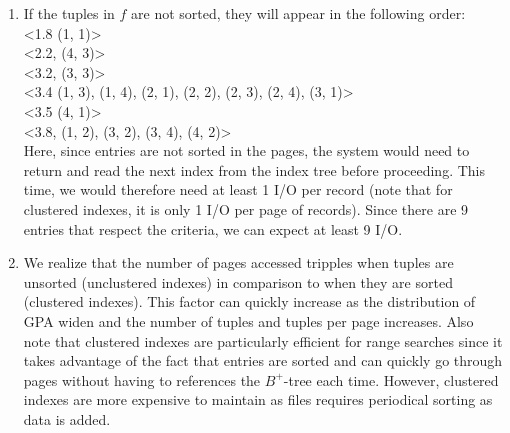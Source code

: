 \begin{enumerate}[label={(\alph*)}]
\begin{enumerate}[label={\arabic*.}]
                \item If the tuples in $f$ are not sorted, they will appear in the following order:\\
                        <1.8 (1, 1)> \\
                        <2.2, (4, 3)> \\
                        <3.2, (3, 3)> \\
                        <3.4 (1, 3), (1, 4), (2, 1), (2, 2), (2, 3), (2, 4), (3, 1)> \\
                        <3.5 (4, 1)> \\
                        <3.8, (1, 2), (3, 2), (3, 4), (4, 2)> \\
                    \noindent Here, since entries are not sorted in the pages, the system would need to return and read the next index from the index tree before proceeding. This time, we would therefore need at least 1 I/O per record (note that for clustered indexes, it is only 1 I/O per page of records). Since there are 9 entries that respect the criteria, we can expect at least 9 I/O.
                \item We realize that the number of pages accessed tripples  when tuples are unsorted (unclustered indexes) in comparison to when they are sorted (clustered indexes). This factor can quickly increase as the distribution of GPA widen and the number of tuples and tuples per page increases. Also note that clustered indexes are particularly efficient for range searches since it takes advantage of the fact that entries are sorted and can quickly go through pages without having to references the $B^+$-tree each time. However, clustered indexes are more expensive to maintain as files requires periodical sorting as data is added. 
            \end{enumerate}
\end{enumerate}